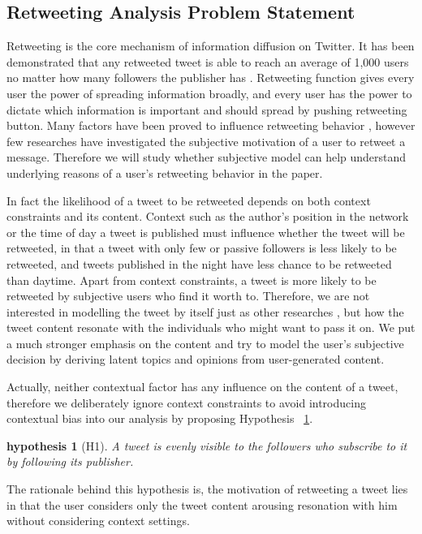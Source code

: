 \documentclass{acm_proc_article-sp}
\newtheorem{hypothesis}{hypothesis}
\begin{document}
\subsection{Retweeting Analysis Problem Statement}
\label{statement}
Retweeting is the core mechanism of information diffusion on Twitter. It has been demonstrated that any retweeted tweet is able to reach an average of 1,000 users no matter how many followers the publisher has \cite{Kwak:2010TSN}. Retweeting function gives every user the power of spreading information broadly, and every user has the power to dictate which information is important and should spread by pushing retweeting button. Many factors have been proved to influence retweeting behavior \cite{Suh2010,conf/icwsm/MacskassyM11,Comarela:2012UFA}, however few researches have investigated the subjective motivation of a user to retweet a message. Therefore we will study whether subjective model can help understand underlying reasons of a user's retweeting behavior in the paper.

In fact the likelihood of a tweet to be retweeted depends on both context constraints and its content. 
Context such as the author's position in the network or the time of day a tweet is published must influence whether the tweet will be retweeted, in that a tweet with only few or passive followers is less likely to be retweeted, and tweets published in the night have less chance to be retweeted than daytime.
Apart from context constraints, a tweet is more likely to be retweeted by subjective users who find it worth to. Therefore, we are not interested in modelling the tweet by itself just as other researches \cite{Naveed:2011SMC,2011:NaveedGKC,conf/icwsm/PfitznerGS12}, but how the tweet content resonate with the individuals who might want to pass it on. We put a much stronger emphasis on the content and try to model the user's subjective decision by deriving latent topics and opinions from user-generated content. 
 
Actually, neither contextual factor has any influence on the content of a tweet, therefore we deliberately ignore context constraints to avoid introducing contextual bias into our analysis by proposing  Hypothesis ~\ref{hypothesis1}. 
\begin{hypothesis}[H1]
\label{hypothesis1}
A tweet is evenly visible to the followers who subscribe to it by following its publisher.
\end{hypothesis}
The rationale behind this hypothesis is, the motivation of retweeting a tweet lies in that the user considers only the tweet content arousing resonation with him without considering context settings.
\end{document}
